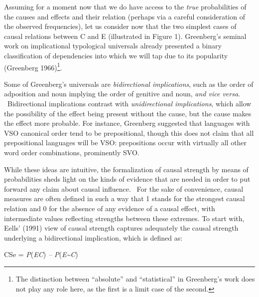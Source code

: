\documentclass[11pt]{article}
\newenvironment{styleStandard}{\setlength\leftskip{0in}\setlength\rightskip{0in}\setlength\parindent{0in}\setlength\parfillskip{0pt plus 1fil}\setlength\parskip{0in plus 1pt}\writerlistparindent\writerlistleftskip\leavevmode\normalfont\normalsize\writerlistlabel\ignorespaces}{\unskip\vspace{0in plus 1pt}\par}
\newcommand\writerlistleftskip{}
\newcommand\writerlistparindent{}
\newcommand\writerlistlabel{}
\begin{document}
\begin{styleStandard}
Assuming for a moment now that we do have access to the \textit{true} probabilities of the causes and effects and their relation (perhaps via a careful consideration of the observed frequencies), let us consider now that the two simplest cases of causal relations between C and E (illustrated in Figure 1). Greenberg’s seminal work on implicational typological universals already presented a binary classification of dependencies into which we will tap due to its popularity (Greenberg 1966)\footnote{ The distinction between “absolute” and “statistical” in Greenberg’s work does not play any role here, as the first is a limit case of the second.\par }. 
\end{styleStandard}


\begin{styleStandard}
Some of Greenberg’s universals are \textit{bidirectional implications}, such as the order of adposition and noun implying the order of genitive and noun, \textit{and vice versa}. \ Bidirectional implications contrast with \textit{unidirectional implications}, which allow the possibility of the effect being present without the cause, but the cause makes the effect more probable. For instance, Greenberg suggested that languages with VSO canonical order tend to be prepositional, though this does not claim that all prepositional languages will be VSO: prepositions occur with virtually all other word order combinations, prominently SVO.
\end{styleStandard}


\begin{styleStandard}
While these ideas are intuitive, the formalization of causal strength by means of probabilities sheds light on the kinds of evidence that are needed in order to put forward any claim about causal influence. \ For the sake of convenience, causal measures are often defined in such a way that 1 stands for the strongest causal relation and 0 for the absence of any evidence of a causal effect, with intermediate values reflecting strengths between these extremes. To start with, Eells’ (1991) view of causal strength captures adequately the causal strength underlying a bidirectional implication, which is defined as:
\end{styleStandard}


\begin{styleStandard}
CSe = \textit{P}(\textit{E{\textbar}C}) \textit{– P}(\textit{E{\textbar}\~{}C})
\end{styleStandard}
\end{document}
